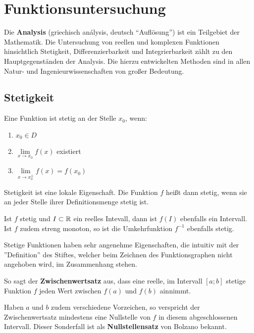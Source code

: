 \documentclass[main.tex]{subfiles}
\begin{document}
\chapter{Funktionsuntersuchung}\label{Funktionsuntersuchung}

Die \textbf{Analysis} (griechisch  análysis, deutsch "`Auflösung"') ist ein Teilgebiet der Mathematik. Die Untersuchung von reellen und komplexen Funktionen hinsichtlich Stetigkeit, Differenzierbarkeit und Integrierbarkeit zählt zu den Hauptgegenständen der Analysis. Die hierzu entwickelten Methoden sind in allen Natur- und Ingenieurwissenschaften von großer Bedeutung.

\section{Stetigkeit}

\begin{Definition}
	Eine Funktion ist stetig an der Stelle $x_{0}$, wenn:
	\begin{enumerate}
		\item $x_{0}\in D$
		\item $\lim\limits_{x \rightarrow x_{0}} {f(x)}$ existiert
		\item $\lim\limits_{x \rightarrow x_{0}^{\pm}} {f(x)}=f(x_{0})$
	\end{enumerate}
\end{Definition}

Stetigkeit ist eine lokale Eigenschaft. Die Funktion $f$ heißt dann stetig, wenn sie an jeder Stelle ihrer Definitionsmenge stetig ist.

\begin{Bemerkung}
	\begin{Theorem}
		Ist $f$ stetig und $I\subset \mathbb{R}$ ein reelles Intevall, dann ist $f(I)$ ebenfalls ein Intervall. Ist $f$ zudem streng monoton, so ist die Umkehrfunktion $f^{-1}$ ebenfalls stetig.
	\end{Theorem}
\end{Bemerkung}

\begin{Bemerkung}
	Stetige Funktionen haben sehr angenehme Eigenschaften, die intuitiv mit der ''Definition'' des Stiftes, welcher beim Zeichnen des Funktionsgraphen nicht angehoben wird, im Zusammenhang stehen.
	
	So sagt der \textbf{Zwischenwertsatz} aus, dass eine reelle, im Intervall $[a;b]$ stetige Funktion $f$ jeden Wert zwischen $f(a)$ und $f(b)$ ainnimmt.

	Haben $a$ und $b$ zudem verschiedene Vorzeichen, so verspricht der Zwischenwertsatz mindestens eine Nullstelle von $f$ in diesem abgeschlossenen Intervall. Dieser Sonderfall ist als \textbf{Nullstellensatz} von Bolzano bekannt.
\end{Bemerkung}
\end{document}
